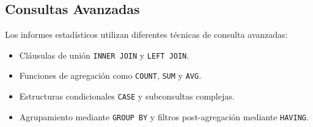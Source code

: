 \subsection{Consultas Avanzadas}

Los informes estadísticos utilizan diferentes técnicas de consulta avanzadas:
\begin{itemize}
	\item Cláusulas de unión \texttt{INNER JOIN} y \texttt{LEFT JOIN}.
	\item Funciones de agregación como \texttt{COUNT}, \texttt{SUM} y \texttt{AVG}.
	\item Estructuras condicionales \texttt{CASE} y subconsultas complejas.
	\item Agrupamiento mediante \texttt{GROUP BY} y filtros post-agregación mediante \texttt{HAVING}.
\end{itemize}
